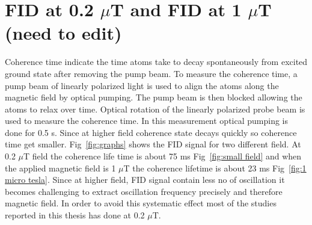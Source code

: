 \section{FID at 0.2 \texorpdfstring{$\mu$}{Lg}T and FID at 1 \texorpdfstring{$\mu$}{Lg}T (need to edit) }
  Coherence time indicate the time atoms take to decay spontaneously from excited ground state after removing the pump beam. To measure the coherence time, a pump beam of linearly polarized light is
used to align the atoms along the magnetic field by optical pumping. The pump
beam is then blocked allowing the atoms to relax over time. Optical rotation of the linearly polarized probe beam is used to measure the coherence time. In this measurement optical pumping is done for 0.5 s. Since at higher field coherence state decays quickly so coherence time get smaller. Fig~\ref{fig:graphs} shows the FID signal for  two different field.  At  0.2 $\mu$T field the coherence life time is about 75 ms Fig~\ref{fig:small field} and when the applied magnetic field is 1 $\mu$T  the coherence lifetime is about 23 ms Fig~\ref{fig:1 micro tesla}. Since at higher field, FID signal contain less no of oscillation it becomes challenging to extract oscillation frequency precisely and therefore magnetic field. In order to avoid this systematic effect most of the studies reported in this thesis has done at 0.2 $\mu$T.
